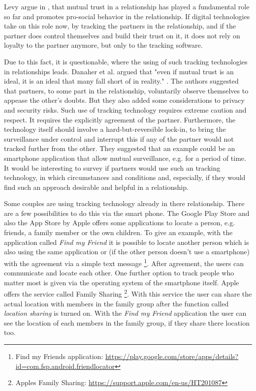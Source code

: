 Levy argue in \cite{levy2014intimate}, that mutual trust in a relationship has played a fundamental role so far and promotes pro-social behavior in the relationship. If digital technologies take on this role now, by tracking the partners in the relationship, and if the partner does control themselves and build their trust on it, it does not rely on loyalty to the partner anymore, but only to the tracking software.

Due to this fact, it is questionable, where the using of such tracking technologies in relationships leads.
Danaher et al. argued that "even if mutual trust is an ideal, it is an ideal that many fall short of in reality." \cite{doi:10.1080/15265161.2017.1409823}.
The authors suggested that partners, to some part in the relationship, voluntarily observe themselves to appease the other's doubts. But they also added some considerations to privacy and security risks. Such use of tracking technology requires extreme caution and respect. It requires the explicitly agreement of the partner. Furthermore, the technology itself should involve a hard-but-reversible lock-in, to bring the surveillance under control and interrupt this if any of the partner would not tracked further from the other.
They suggested that an example could be an smartphone application that allow mutual surveillance, e.g. for a period of time.
It would be interesting to survey if partners would use such an tracking technology, in which circumstances and conditions and, especially, if they would find such an approach desirable and helpful in a relationship. 

Some couples are using tracking technology already in there relationship. %
There are a few possibilities to do this via the smart phone. The Google Play Store and also the App Store by Apple offers some applications to locate a person, e.g. friends, a family member or the own children. To give an example, with the application called \textit{Find my Friend} it is possible to locate another person which is also using the same application or (if the other person doesn't use a smartphone) with the agreement via a simple text message \footnote{Find my Friends application: \url{https://play.google.com/store/apps/details?id=com.fsp.android.friendlocator}}. After agreement, the users can communicate and locate each other.
One further option to track people who matter most is given via the operating system of the smartphone itself. Apple offers the service called Family Sharing \footnote{Apples Family Sharing: \url{https://support.apple.com/en-us/HT201087}}. With this service the user can share the actual location with members in the family group after the function called \textit{location sharing} is turned on. With the \textit{Find my Friend} application the user can see the location of each members in the family group, if they share there location too.

